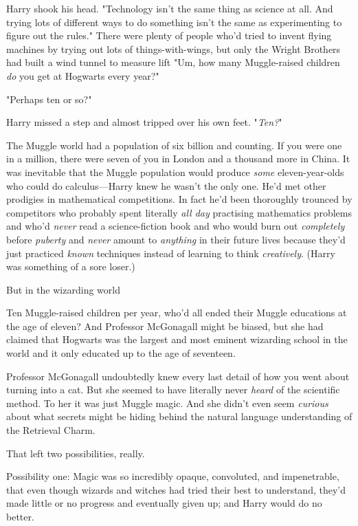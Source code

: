Harry shook his head. "Technology isn't the same thing as science at all. And
trying lots of different ways to do something isn't the same as experimenting
to figure out the rules." There were plenty of people who'd tried to invent
flying machines by trying out lots of things-with-wings, but only the Wright
Brothers had built a wind tunnel to measure lift{\el} "Um, how many
Muggle-raised children \emph{do} you get at Hogwarts every year?"

"Perhaps ten or so?"

Harry missed a step and almost tripped over his own feet. "\emph{Ten?}"

The Muggle world had a population of six billion and counting. If you were one
in a million, there were seven of you in London and a thousand more in China.
It was inevitable that the Muggle population would produce \emph{some}
eleven-year-olds who could do calculus—Harry knew he wasn't the only one.
He'd met other prodigies in mathematical competitions. In fact he'd been
thoroughly trounced by competitors who probably spent literally \emph{all day}
practising mathematics problems and who'd \emph{never} read a science-fiction book
and who would burn out \emph{completely} before \emph{puberty} and \emph{never}
amount to \emph{anything} in their future lives because they'd just practiced
\emph{known} techniques instead of learning to think \emph{creatively}. (Harry
was something of a sore loser.)

But{\el} in the wizarding world{\el}

Ten Muggle-raised children per year, who'd all ended their Muggle educations at
the age of eleven? And Professor McGonagall might be biased, but she had
claimed that Hogwarts was the largest and most eminent wizarding school in the
world{\el} and it only educated up to the age of seventeen.

Professor McGonagall undoubtedly knew every last detail of how you went about
turning into a cat. But she seemed to have literally never \emph{heard} of the
scientific method. To her it was just Muggle magic. And she didn't even seem
\emph{curious} about what secrets might be hiding behind the natural language
understanding of the Retrieval Charm.

That left two possibilities, really.

Possibility one: Magic was so incredibly opaque, convoluted, and impenetrable,
that even though wizards and witches had tried their best to understand, they'd
made little or no progress and eventually given up; and Harry would do no
better.

